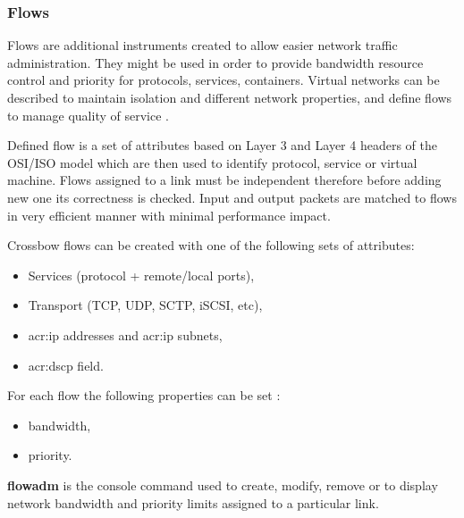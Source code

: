 \documentclass[11pt]{book}
\begin{document}
        \subsubsection{Flows}

          Flows are additional instruments created to allow easier network traffic administration. They might be used in
          order to provide bandwidth resource control and priority for protocols, services, containers. Virtual networks
          can be described to maintain isolation and different network properties, and define flows to manage quality of
          service \cite{network_virtualization}.

          Defined flow is a set of attributes based on Layer 3 and Layer 4 headers of the OSI/ISO model which are then
          used to identify protocol, service or virtual machine.  Flows assigned to a link must be independent therefore
          before adding new one its correctness is checked. Input and output packets are matched to flows in very
          efficient manner with minimal performance impact.

          \medskip

          Crossbow flows can be created with one of the following sets of attributes:

          \begin{itemize}
            \item Services (protocol + remote/local ports),
            \item Transport (TCP, UDP, SCTP, iSCSI, etc),
            \item \gls{acr:ip} addresses and \gls{acr:ip} subnets,
            \item \gls{acr:dscp} field.
          \end{itemize}

          For each flow the following properties can be set \cite{flows2}: 

          \begin{itemize}
            \item bandwidth,
            \item priority.
          \end{itemize}

          \medskip

          

          \textbf{flowadm} is the console command used to create, modify, remove or to display network bandwidth and
          priority limits assigned to a particular link. 
\end{document}
